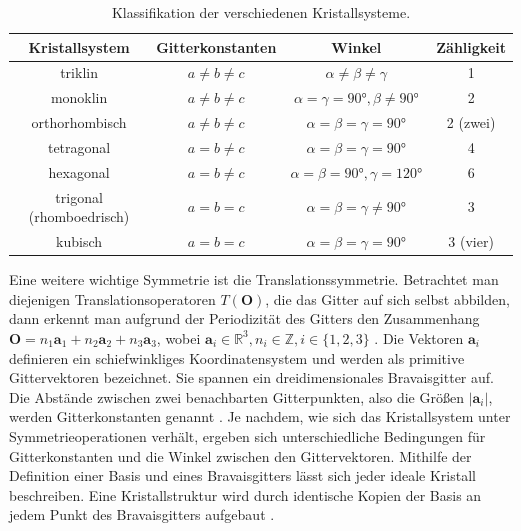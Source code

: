 \begin{table}[h]
    \centering
    \begin{tabular}{c c c c}
        \toprule
        Kristallsystem           & Gitterkonstanten  & Winkel                                       & Zähligkeit \\ \midrule
        triklin                  & $a \neq b \neq c$ & $\alpha \neq\beta \neq\gamma$                & 1          \\
        monoklin                 & $a \neq b \neq c$ & $\alpha=\gamma=\ang{90},\beta \neq \ang{90}$ & 2          \\
        orthorhombisch           & $a \neq b \neq c$ & $\alpha=\beta=\gamma=\ang{90}$               & 2 (zwei)   \\
        tetragonal               & $a = b \neq c$    & $\alpha=\beta=\gamma=\ang{90}$               & 4          \\
        hexagonal                & $a = b \neq c$    & $\alpha=\beta=\ang{90}, \gamma=\ang{120}$    & 6          \\
        trigonal (rhomboedrisch) & $a=b=c$           & $\alpha=\beta=\gamma \neq \ang{90}$          & 3          \\
        kubisch                  & $a=b=c$           & $\alpha=\beta=\gamma=\ang{90}$               & 3 (vier)   \\ \bottomrule
    \end{tabular}
    \caption{Klassifikation der verschiedenen Kristallsysteme.  }
    \label{tab:krystallsysteme}
\end{table}

Eine weitere wichtige Symmetrie ist die Translationssymmetrie.
Betrachtet man diejenigen Translationsoperatoren $T(\mathbf{O})$, die das Gitter auf sich selbst abbilden, dann erkennt
man aufgrund der Periodizität des Gitters den Zusammenhang
$\mathbf{O} = n_{1}\mathbf{a}_{1}+n_{2}\mathbf{a}_{2}+n_{3}\mathbf{a}_{3}$, wobei
$\mathbf{a}_{i}\in\mathbb{R}^{3}, n_{i}\in\mathbb{Z}, i\in \{1,2,3\}$ \autocite{Hunklinger}.
Die Vektoren $\mathbf{a}_{i}$
definieren ein schiefwinkliges Koordinatensystem und werden als primitive Gittervektoren bezeichnet.
Sie spannen ein dreidimensionales Bravaisgitter auf.
Die Abstände zwischen zwei benachbarten Gitterpunkten, also die Größen
$\lvert \mathbf{a}_{i} \rvert$, werden Gitterkonstanten genannt \autocite{Ashcroft}.
Je nachdem, wie sich das Kristallsystem unter Symmetrieoperationen verhält, ergeben sich unterschiedliche Bedingungen für
Gitterkonstanten und die Winkel zwischen den Gittervektoren.
Mithilfe der Definition einer Basis und eines Bravaisgitters lässt sich jeder ideale Kristall beschreiben.
Eine Kristallstruktur wird durch identische Kopien der Basis an jedem Punkt des Bravaisgitters aufgebaut
\autocite{Ashcroft}.


